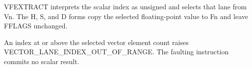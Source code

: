 VFEXTRACT interprets the scalar index as unsigned and selects that lane from
Vn. The H, S, and D forms copy the selected floating-point value to Fn and
leave FFLAGS unchanged.

An index at or above the selected vector element count raises
VECTOR\_LANE\_INDEX\_OUT\_OF\_RANGE. The faulting instruction
commits no scalar result.
